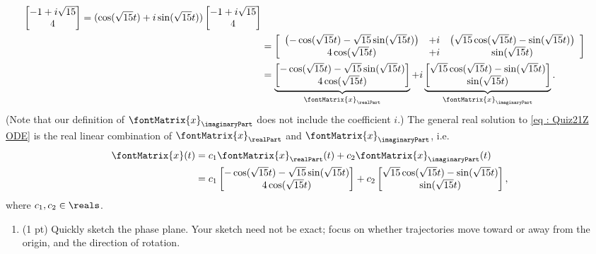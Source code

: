 {\begin{align*}
\begin{bmatrix}
-1 + i \sqrt{15}	\\
4
\end{bmatrix}
=
(\cos(\sqrt{15} t) + i \sin(\sqrt{15} t))
\begin{bmatrix}
-1 + i \sqrt{15}	\\
4
\end{bmatrix}
\\
&=
\left[
\begin{array}{c c c}
\left(-\cos(\sqrt{15} t) - \sqrt{15} \sin(\sqrt{15} t)\right)	&	+ i	&	\left(\sqrt{15} \cos(\sqrt{15} t) - \sin(\sqrt{15} t)\right)	\\
4 \cos(\sqrt{15} t)							&	+ i	&	\sin(\sqrt{15} t)
\end{array}
\right]
\\
&=
\underbrace{
\begin{bmatrix}%
-\cos(\sqrt{15} t) - \sqrt{15} \sin(\sqrt{15} t)	\\
4 \cos(\sqrt{15} t)
\end{bmatrix}%
}_{\fontMatrix{x}_{\realPart}}
+
i \underbrace{
\begin{bmatrix}%
\sqrt{15} \cos(\sqrt{15} t) - \sin(\sqrt{15} t)	\\
\sin(\sqrt{15} t)
\end{bmatrix}%
}_{\fontMatrix{x}_{\imaginaryPart}}.
\end{align*}
(Note that our definition of $\fontMatrix{x}_{\imaginaryPart}$ does not include the coefficient $i$.) The general real solution to \eqref{eq : Quiz21Z ODE} is the real linear combination of $\fontMatrix{x}_{\realPart}$ and $\fontMatrix{x}_{\imaginaryPart}$, i.e.
\begin{align*}
\fontMatrix{x}(t)
&=
c_{1} \fontMatrix{x}_{\realPart}(t) + c_{2} \fontMatrix{x}_{\imaginaryPart}(t)
\\
&=
c_{1}
\begin{bmatrix}%
-\cos(\sqrt{15} t) - \sqrt{15} \sin(\sqrt{15} t)	\\
4 \cos(\sqrt{15} t)
\end{bmatrix}%
+
c_{2}
\begin{bmatrix}%
\sqrt{15} \cos(\sqrt{15} t) - \sin(\sqrt{15} t)	\\
\sin(\sqrt{15} t)
\end{bmatrix}%
,
\end{align*}
where $c_{1},c_{2} \in \reals$.}%

\begin{enumerate}[resume,label=(\alph*)]
\item (1 pt) Quickly sketch the phase plane. Your sketch need not be exact; focus on whether trajectories move toward or away from the origin, and the direction of rotation.
\end{enumerate}


